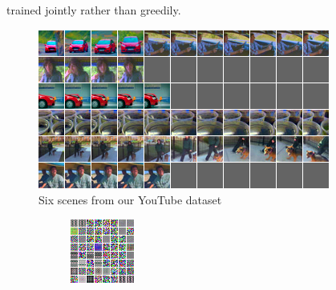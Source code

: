 trained jointly rather than greedily.  \begin{figure} \centering
\includegraphics[scale=0.5]{./figures/slow/youtube.png} \caption{Six scenes from our
YouTube dataset \label{fig:youtube}}  \end{figure} \begin{figure}[ht]
\centering \newcommand{\figspace}{0.0cm} \newcommand{\figsize}{0.24\textwidth}
\begin{subfigure}[b]{\figsize}
\includegraphics[width=\textwidth]{./figures/slow/Rebbutal_Figures/filters_drlim.png}
\caption{} \label{fig:drlimfilters} \end{subfigure} \hspace{\figspace}
\begin{subfigure}[b]{\figsize}

\end{subfigure}
\end{figure}
